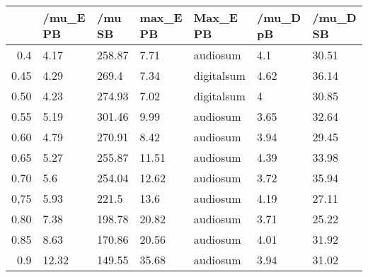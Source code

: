 \begin{table}[ht]
\centering
\begin{tabular}{rllllll}
  \hline
 & /mu\_E PB & /mu SB & max\_E PB & Max\_E PB & /mu\_D pB & /mu\_D SB \\ 
  \hline
0.4 & 4.17 & 258.87 & 7.71 & audiosum & 4.1 & 30.51 \\ 
  0.45 & 4.29 & 269.4 & 7.34 & digitalsum & 4.62 & 36.14 \\ 
  0.50 & 4.23 & 274.93 & 7.02 & digitalsum & 4 & 30.85 \\ 
  0.55 & 5.19 & 301.46 & 9.99 & audiosum & 3.65 & 32.64 \\ 
  0.60 & 4.79 & 270.91 & 8.42 & audiosum & 3.94 & 29.45 \\ 
  0.65 & 5.27 & 255.87 & 11.51 & audiosum & 4.39 & 33.98 \\ 
  0.70 & 5.6 & 254.04 & 12.62 & audiosum & 3.72 & 35.94 \\ 
  0,75 & 5.93 & 221.5 & 13.6 & audiosum & 4.19 & 27.11 \\ 
  0.80 & 7.38 & 198.78 & 20.82 & audiosum & 3.71 & 25.22 \\ 
  0.85 & 8.63 & 170.86 & 20.56 & audiosum & 4.01 & 31.92 \\ 
  0.9 & 12.32 & 149.55 & 35.68 & audiosum & 3.94 & 31.02 \\ 
   \hline
\end{tabular}
\end{table}
